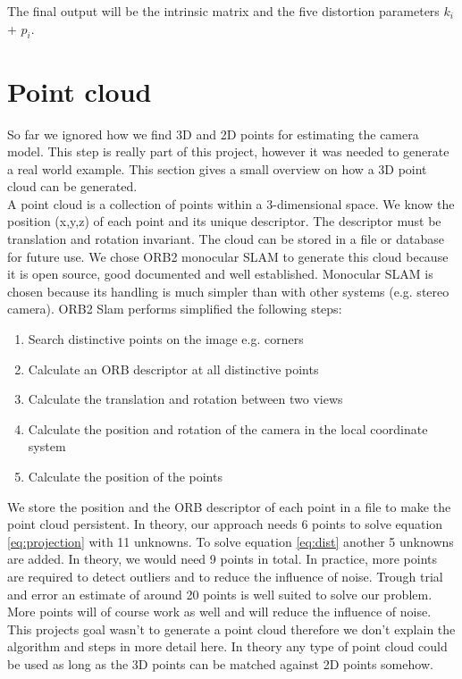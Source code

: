 \documentclass[11pt,a4paper,titlepage,oneside]{report}
\begin{document}
The final output will be the intrinsic matrix and the five distortion parameters $k_i$ + $p_i$.

\section{Point cloud}
So far we ignored how we find 3D and 2D points for estimating the camera model. This step is really part of this project, however it was needed to generate a real world example. This section gives a small overview on how a 3D point cloud can be generated.\\
A point cloud is a collection of points within a 3-dimensional space. We know the position (x,y,z) of each point and its unique descriptor. The descriptor must be translation and rotation invariant. The cloud can be stored in a file or database for future use. We chose ORB2 monocular SLAM \cite{orbslam2} to generate this cloud because it is open source, good documented and well established. Monocular SLAM is chosen because its handling is much simpler than with other systems (e.g. stereo camera). ORB2 Slam performs simplified the following steps:
\begin{enumerate}
\item Search distinctive points on the image e.g. corners
\item Calculate an ORB descriptor at all distinctive points
\item Calculate the translation and rotation between two views
\item Calculate the position and rotation of the camera in the local coordinate system
\item Calculate the position of the points
\end{enumerate}
We store the position and the ORB descriptor of each point in a file to make the point cloud persistent.
In theory, our approach needs 6 points to solve equation \ref{eq:projection} with 11 unknowns. To solve equation \ref{eq:dist} another 5 unknowns are added. In theory, we would need 9 points in total. In practice, more points are required to detect outliers and to reduce the influence of noise. Trough trial and error an estimate of around 20 points is well suited to solve our problem. More points will of course work as well and will reduce the influence of noise.\\
This projects goal wasn't to generate a point cloud therefore we don't explain the algorithm and steps in more detail here. In theory any type of point cloud could be used as long as the 3D points can be matched against 2D points somehow.
\end{document}
